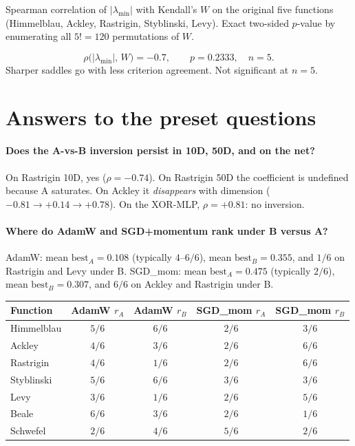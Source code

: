 \documentclass[11pt]{article}
\begin{document}
Spearman correlation of $|\lambda_{\min}|$ with Kendall's $W$ on the original
five functions (Himmelblau, Ackley, Rastrigin, Styblinski, Levy). Exact
two-sided $p$-value by enumerating all $5!=120$ permutations of $W$.

\[
\rho\bigl(|\lambda_{\min}|,\,W\bigr) = -0.7,\qquad p = 0.2333,\quad n=5.
\]
Sharper saddles go with less criterion agreement. Not significant at $n=5$.

\section{Answers to the preset questions}

\paragraph{Does the A-vs-B inversion persist in 10D, 50D, and on the net?}
On Rastrigin 10D, yes ($\rho=-0.74$). On Rastrigin 50D the coefficient is
undefined because A saturates. On Ackley it \emph{disappears} with dimension
($-0.81\to +0.14\to +0.78$). On the XOR-MLP, $\rho=+0.81$: no inversion.

\paragraph{Where do AdamW and SGD+momentum rank under B versus A?}
AdamW: mean $\mathrm{best}_A=0.108$ (typically $4$--$6/6$),
mean $\mathrm{best}_B=0.355$, and $1/6$ on Rastrigin and Levy under B.
SGD\_mom: mean $\mathrm{best}_A=0.475$ (typically $2/6$),
mean $\mathrm{best}_B=0.307$, and $6/6$ on Ackley and Rastrigin under B.

\begin{center}
\small
\begin{tabular}{lcccc}
\toprule
Function & AdamW $r_A$ & AdamW $r_B$ & SGD\_mom $r_A$ & SGD\_mom $r_B$ \\
\midrule
Himmelblau & $5/6$ & $6/6$ & $2/6$ & $3/6$ \\
Ackley     & $4/6$ & $3/6$ & $2/6$ & $6/6$ \\
Rastrigin  & $4/6$ & $1/6$ & $2/6$ & $6/6$ \\
Styblinski & $5/6$ & $6/6$ & $3/6$ & $3/6$ \\
Levy       & $3/6$ & $1/6$ & $2/6$ & $5/6$ \\
Beale      & $6/6$ & $3/6$ & $2/6$ & $1/6$ \\
Schwefel   & $2/6$ & $4/6$ & $5/6$ & $2/6$ \\
\bottomrule
\end{tabular}
\end{center}
\end{document}
